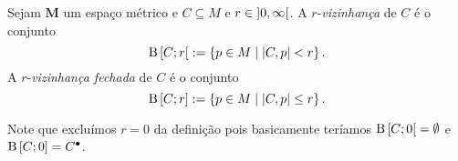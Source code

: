 \begin{definition}
Sejam $\bm M$ um espaço métrico e $C \subseteq M$ e $r \in \left]{0},{\infty}\right[$. A $r$-\emph{vizinhança} de $C$ é o conjunto
	\begin{equation*}
	\mathrm{B}\left[{C};{r}\right[ := \left\{{p \in M}\;\middle\vert\;{\left\vert{C},{p}\right\vert < r}\right\}.
	\end{equation*}
 A $r$-\emph{vizinhança fechada} de $C$ é o conjunto
	\begin{equation*}
	\mathrm{B}\left[{C};{r}\right] := \left\{{p \in M}\;\middle\vert\;{\left\vert{C},{p}\right\vert \leq r}\right\}.
	\end{equation*}
\end{definition}

Note que excluímos $r=0$ da definição pois basicamente teríamos $\mathrm{B}\left[{C};{0}\right[ = \emptyset$ e $\mathrm{B}\left[{C};{0}\right] = {C}^\bullet$.
	
